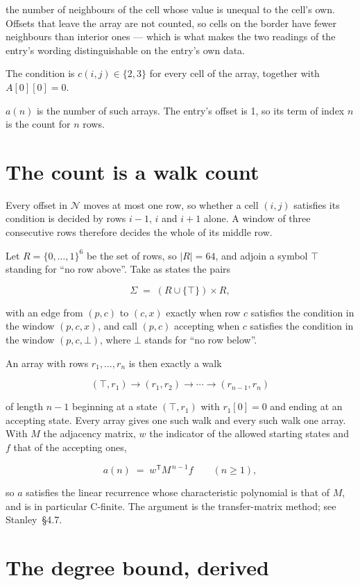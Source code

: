 \documentclass[11pt]{article}
\theoremstyle{definition}
\begin{document}
the number of neighbours of the cell whose value is unequal to the cell's own. Offsets that leave the array are not counted, so cells on the border have fewer neighbours than interior ones --- which is what makes the two readings of the entry's wording distinguishable on the entry's own data.

The condition is $c(i,j) \in \{2, 3\}$ for every cell of the array, together with $A[0][0]=0$.

$a(n)$ is the number of such arrays. The entry's offset is 1, so its term of index $n$ is the count for $n$ rows.

\section{The count is a walk count}

Every offset in $\mathcal{N}$ moves at most one row, so whether a cell $(i,j)$ satisfies its condition is decided by rows $i-1$, $i$ and $i+1$ alone. A window of three consecutive rows therefore decides the whole of its middle row.

Let $R = \{0,\dots,1\}^{6}$ be the set of rows, so $|R| = 64$, and adjoin a symbol $\top$ standing for ``no row above''. Take as states the pairs

\[\Sigma \;=\; (R \cup \{\top\}) \times R,\]

with an edge from $(p,c)$ to $(c,x)$ exactly when row $c$ satisfies the condition in the window $(p,c,x)$, and call $(p,c)$ accepting when $c$ satisfies the condition in the window $(p,c,\bot)$, where $\bot$ stands for ``no row below''.

An array with rows $r_1,\dots,r_n$ is then exactly a walk

\[(\top,r_1) \to (r_1,r_2) \to \cdots \to (r_{n-1},r_n)\]

of length $n-1$ beginning at a state $(\top,r_1)$ with $r_1[0]=0$ and ending at an accepting state. Every array gives one such walk and every such walk one array. With $M$ the adjacency matrix, $w$ the indicator of the allowed starting states and $f$ that of the accepting ones,

\[a(n) \;=\; w^{\mathsf T} M^{\,n-1} f \qquad (n \ge 1),\]

so $a$ satisfies the linear recurrence whose characteristic polynomial is that of $M$, and is in particular C-finite. The argument is the transfer-matrix method; see Stanley~\S4.7.

\section{The degree bound, derived}
\end{document}
